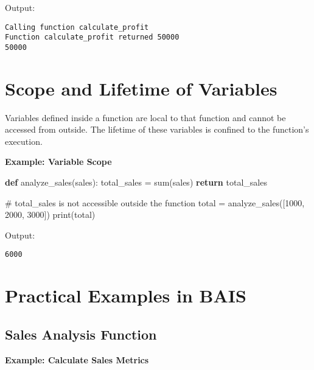 \documentclass[
  letterpaper,
  DIV=11,
  numbers=noendperiod]{scrreprt}
\newenvironment{Shaded}{\begin{snugshade}}{\end{snugshade}}
\newcommand{\BuiltInTok}[1]{\textcolor[rgb]{0.00,0.23,0.31}{#1}}
\newcommand{\CommentTok}[1]{\textcolor[rgb]{0.37,0.37,0.37}{#1}}
\newcommand{\ControlFlowTok}[1]{\textcolor[rgb]{0.00,0.23,0.31}{\textbf{#1}}}
\newcommand{\DecValTok}[1]{\textcolor[rgb]{0.68,0.00,0.00}{#1}}
\newcommand{\KeywordTok}[1]{\textcolor[rgb]{0.00,0.23,0.31}{\textbf{#1}}}
\newcommand{\NormalTok}[1]{\textcolor[rgb]{0.00,0.23,0.31}{#1}}
\newcommand{\OperatorTok}[1]{\textcolor[rgb]{0.37,0.37,0.37}{#1}}
\begin{document}
Output:

\begin{verbatim}
Calling function calculate_profit
Function calculate_profit returned 50000
50000
\end{verbatim}

\section{Scope and Lifetime of
Variables}\label{scope-and-lifetime-of-variables}

Variables defined inside a function are local to that function and
cannot be accessed from outside. The lifetime of these variables is
confined to the function's execution.

\textbf{Example: Variable Scope}

\begin{Shaded}
\begin{Highlighting}[]
\KeywordTok{def}\NormalTok{ analyze\_sales(sales):}
\NormalTok{    total\_sales }\OperatorTok{=} \BuiltInTok{sum}\NormalTok{(sales)}
    \ControlFlowTok{return}\NormalTok{ total\_sales}

\CommentTok{\# total\_sales is not accessible outside the function}
\NormalTok{total }\OperatorTok{=}\NormalTok{ analyze\_sales([}\DecValTok{1000}\NormalTok{, }\DecValTok{2000}\NormalTok{, }\DecValTok{3000}\NormalTok{])}
\BuiltInTok{print}\NormalTok{(total)}
\end{Highlighting}
\end{Shaded}

Output:

\begin{verbatim}
6000
\end{verbatim}

\section{Practical Examples in BAIS}\label{practical-examples-in-bais}

\subsection{Sales Analysis Function}\label{sales-analysis-function}

\textbf{Example: Calculate Sales Metrics}
\end{document}
